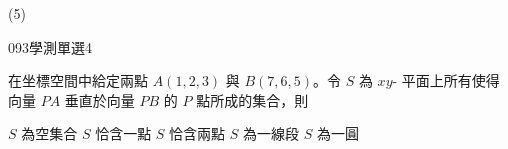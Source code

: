 \begin{QUESTIONS}
\begin{QUESTION}
\begin{QBODY}
\begin{QOPS}
                \QOP {}
            \end{QOPS}
        \end{QBODY}
        \begin{QFROMS}
        \end{QFROMS}
        \begin{QTAGS}\end{QTAGS}
        \begin{QANS}
            (5)
        \end{QANS}
        \begin{QSOLLIST}
        \end{QSOLLIST}
        \begin{QEMPTYSPACE}
        \end{QEMPTYSPACE}
    \end{QUESTION}
    \begin{QUESTION}
        \begin{ExamInfo}{093}{學測}{單選}{4}
        \end{ExamInfo}
        \begin{ExamAnsRateInfo}{23}{42}{17}{10}
        \end{ExamAnsRateInfo}
        \begin{QBODY}
            在坐標空間中給定兩點 $A(1,2,3)$ 與 $B(7,6,5)$。令 $S$ 為 $xy$- 平面上所有使得向量 $PA$ 垂直於向量 $PB$ 的 $P$ 點所成的集合，則
            \begin{QOPS} 
                \QOP $S$ 為空集合 
                \QOP $S$ 恰含一點 
                \QOP $S$ 恰含兩點 
                \QOP $S$ 為一線段 
                \QOP $S$ 為一圓
            \end{QOPS}
        \end{QBODY}
        \begin{QFROMS}
        \end{QFROMS}
        \begin{QTAGS}\end{QTAGS}

\end{QUESTION}
\end{QUESTIONS}

